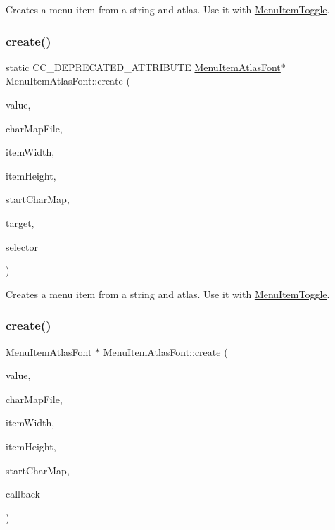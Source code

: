 Creates a menu item from a string and atlas. Use it with \hyperlink{classMenuItemToggle}{Menu\+Item\+Toggle}. \mbox{\label{classMenuItemAtlasFont_af387aecdf81b2ec41e101835c4bf7111}} 
\subsubsection{\texorpdfstring{create()}{create()}\hspace{0.1cm}{\footnotesize\ttfamily [4/6]}}
{\footnotesize\ttfamily static C\+C\+\_\+\+D\+E\+P\+R\+E\+C\+A\+T\+E\+D\+\_\+\+A\+T\+T\+R\+I\+B\+U\+TE \hyperlink{classMenuItemAtlasFont}{Menu\+Item\+Atlas\+Font}$\ast$ Menu\+Item\+Atlas\+Font\+::create (\begin{DoxyParamCaption}\item[{const std\+::string \&}]{value,  }\item[{const std\+::string \&}]{char\+Map\+File,  }\item[{int}]{item\+Width,  }\item[{int}]{item\+Height,  }\item[{char}]{start\+Char\+Map,  }\item[{\hyperlink{classRef}{Ref} $\ast$}]{target,  }\item[{S\+E\+L\+\_\+\+Menu\+Handler}]{selector }\end{DoxyParamCaption})\hspace{0.3cm}{\ttfamily [static]}}

Creates a menu item from a string and atlas. Use it with \hyperlink{classMenuItemToggle}{Menu\+Item\+Toggle}. \mbox{\label{classMenuItemAtlasFont_a4257e6945518624b8bad2ab43ed9456e}} 
\subsubsection{\texorpdfstring{create()}{create()}\hspace{0.1cm}{\footnotesize\ttfamily [5/6]}}
{\footnotesize\ttfamily \hyperlink{classMenuItemAtlasFont}{Menu\+Item\+Atlas\+Font} $\ast$ Menu\+Item\+Atlas\+Font\+::create (\begin{DoxyParamCaption}\item[{const std\+::string \&}]{value,  }\item[{const std\+::string \&}]{char\+Map\+File,  }\item[{int}]{item\+Width,  }\item[{int}]{item\+Height,  }\item[{char}]{start\+Char\+Map,  }\item[{const cc\+Menu\+Callback \&}]{callback }\end{DoxyParamCaption})\hspace{0.3cm}{\ttfamily [static]}}

